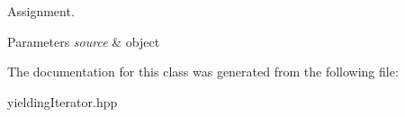Assignment. 
\begin{DoxyParams}{Parameters}
{\em source} & object \\
\hline
\end{DoxyParams}


The documentation for this class was generated from the following file\+:\begin{DoxyCompactItemize}
\item 
yielding\+Iterator.\+hpp\end{DoxyCompactItemize}
